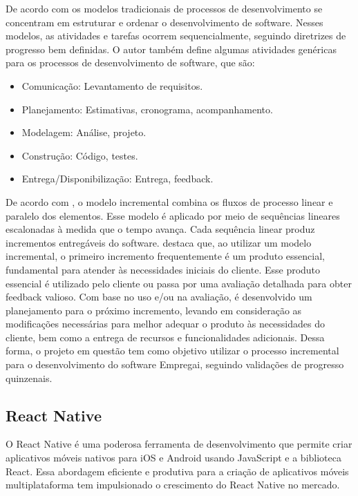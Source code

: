 De acordo com \textcite{Pressman2016} os modelos tradicionais de processos de desenvolvimento se concentram em estruturar e ordenar o desenvolvimento de software. 
Nesses modelos, as atividades e tarefas ocorrem sequencialmente, seguindo diretrizes de progresso bem definidas. O autor também define algumas atividades genéricas
para os processos de desenvolvimento de software, que são:
\begin{itemize}[label=$\bullet$]
	\item Comunicação: Levantamento de requisitos.
	\item Planejamento: Estimativas, cronograma, acompanhamento.
	\item Modelagem: Análise, projeto.
	\item Construção: Código, testes.
	\item Entrega/Disponibilização: Entrega, feedback.
	\end{itemize}
	De acordo com \textcite{Pressman2016}, o modelo incremental combina os fluxos de processo linear e paralelo dos elementos. Esse modelo é aplicado por
	meio de sequências lineares escalonadas à medida que o tempo avança. Cada sequência linear produz incrementos entregáveis do software.
	\textcite{Pressman2016} destaca que, ao utilizar um modelo incremental, o primeiro incremento frequentemente é um produto essencial, fundamental 
	para atender às necessidades iniciais do cliente. Esse produto essencial é utilizado pelo cliente ou passa por uma avaliação detalhada para obter feedback valioso. 
	Com base no uso e/ou na avaliação, é desenvolvido um planejamento para o próximo incremento, levando em consideração as modificações necessárias para melhor adequar o 
	produto às necessidades do cliente, bem como a entrega de recursos e funcionalidades adicionais.
	\newline Dessa forma, o projeto em questão tem como objetivo utilizar o processo incremental para o desenvolvimento do software Empregai, seguindo validações de progresso quinzenais.

\subsection{React Native}
O React Native é uma poderosa ferramenta de desenvolvimento que permite criar aplicativos móveis nativos para iOS e Android usando JavaScript e a biblioteca React. Essa abordagem eficiente e produtiva para a criação de aplicativos móveis multiplataforma tem impulsionado o crescimento do React Native no mercado.

